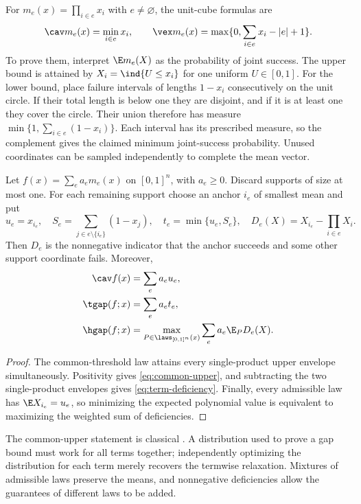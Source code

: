 For $m_e(x)=\prod_{i\in e}x_i$ with $e\ne\varnothing$, the unit-cube
formulas are
\begin{equation}\label{eq:monomial-envelopes}
 \cav m_e(x)=\min_{i\in e}x_i,\qquad
 \vex m_e(x)=\max\{0,\sum_{i\in e}x_i-|e|+1\}.
\end{equation}
To prove them, interpret $\E m_e(X)$ as the probability of joint success.
The upper bound is attained by $X_i=\ind\{U\le x_i\}$ for one uniform
$U\in[0,1]$. For the lower bound, place failure intervals of lengths
$1-x_i$ consecutively on the unit circle. If their total length is below
one they are disjoint, and if it is at least one they cover the circle.
Their union therefore has measure $\min\{1,\sum_{i\in e}(1-x_i)\}$.
Each interval has its prescribed measure, so the complement gives the
claimed minimum joint-success probability. Unused coordinates can be
sampled independently to complete the mean vector.

\begin{proposition}
\label{prop:deficiency}
Let $f(x)=\sum_e a_e m_e(x)$ on $[0,1]^n$, with $a_e\ge0$. Discard
supports of size at most one. For each remaining support choose an anchor
$i_e$ of smallest mean and put
\[
 u_e=x_{i_e},\quad S_e=\sum_{j\in e\setminus\{i_e\}}(1-x_j),
 \quad t_e=\min\{u_e,S_e\},\quad
 D_e(X)=X_{i_e}-\prod_{i\in e}X_i.
\]
Then $D_e$ is the nonnegative indicator that the anchor succeeds and some
other support coordinate fails. Moreover,
\begin{align}
 \cav f(x)&=\sum_e a_eu_e,\label{eq:common-upper}\\
 \tgap(f;x)&=\sum_e a_et_e,\label{eq:term-deficiency}\\
 \hgap(f;x)&=\max_{P\in\laws_{[0,1]^n}(x)}
                     \sum_e a_e\E_P D_e(X).\label{eq:hull-deficiency}
\end{align}
\end{proposition}
\begin{proof}
The common-threshold law attains every single-product upper envelope
simultaneously. Positivity gives \eqref{eq:common-upper}, and subtracting
the two single-product envelopes gives \eqref{eq:term-deficiency}.
Finally, every admissible law has $\E X_{i_e}=u_e$, so minimizing the
expected polynomial value is equivalent to maximizing the weighted
sum of deficiencies.
\end{proof}

The common-upper statement is classical
\citep[Theorems 4--5 in the authors' manuscript]{Luedtke2012}. A distribution
used to prove a gap bound must work for all terms together; independently
optimizing the distribution for each term merely recovers the termwise
relaxation. Mixtures of admissible laws preserve the means, and nonnegative
deficiencies allow the guarantees of different laws to be added.

